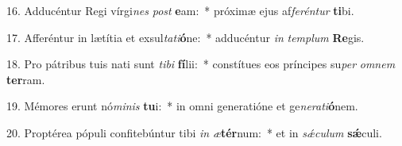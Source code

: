 16. Adducéntur Regi vírgi\textit{nes} \textit{post} \textbf{e}am:~*  próximæ ejus af\textit{fe}\textit{rén}\textit{tur} \textbf{ti}bi.\

17. Afferéntur in lætítia et exsul\textit{ta}\textit{ti}\textbf{ó}ne:~*  adducéntur \textit{in} \textit{tem}\textit{plum} \textbf{Re}gis.\

18. Pro pátribus tuis nati sunt \textit{ti}\textit{bi} \textbf{fí}lii:~*  constítues eos príncipes su\textit{per} \textit{om}\textit{nem} \textbf{ter}ram.\

19. Mémores erunt nó\textit{mi}\textit{nis} \textbf{tu}i:~*  in omni generatióne et ge\textit{ne}\textit{ra}\textit{ti}\textbf{ó}nem.\

20. Proptérea pópuli confitebúntur tibi \textit{in} \textit{æ}\textbf{tér}num:~*  et in \textit{sǽ}\textit{cu}\textit{lum} \textbf{sǽ}culi.\


